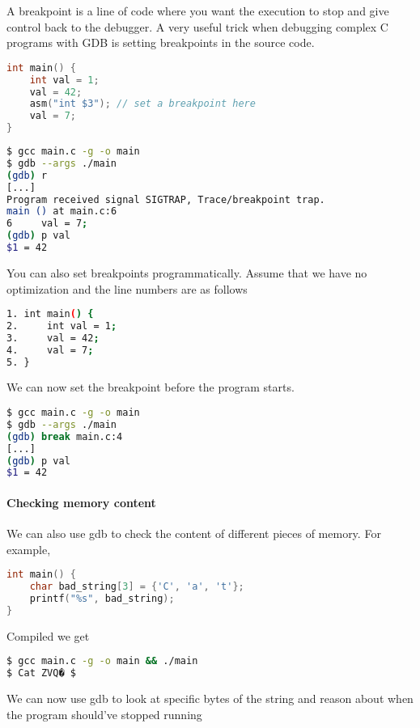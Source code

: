 A breakpoint is a line of code where you want the execution to stop and give control back to the debugger.
A very useful trick when debugging complex C programs with GDB is setting breakpoints in the source code.

\begin{lstlisting}[language=C]
int main() {
    int val = 1;
    val = 42;
    asm("int $3"); // set a breakpoint here
    val = 7;
}
\end{lstlisting}

\begin{lstlisting}[language=bash]
$ gcc main.c -g -o main
$ gdb --args ./main
(gdb) r
[...]
Program received signal SIGTRAP, Trace/breakpoint trap.
main () at main.c:6
6     val = 7;
(gdb) p val
$1 = 42
\end{lstlisting}

You can also set breakpoints programmatically.
Assume that we have no optimization and the line numbers are as follows

\begin{lstlisting}[language=bash]
1. int main() {
2.     int val = 1;
3.     val = 42;
4.     val = 7;
5. }
\end{lstlisting}

We can now set the breakpoint before the program starts.

\begin{lstlisting}[language=bash]
$ gcc main.c -g -o main
$ gdb --args ./main
(gdb) break main.c:4
[...]
(gdb) p val
$1 = 42
\end{lstlisting}

\paragraph{Checking memory content}


We can also use gdb to check the content of different pieces of memory.
For example,

\begin{lstlisting}[language=C]
int main() {
    char bad_string[3] = {'C', 'a', 't'};
    printf("%s", bad_string);
}
\end{lstlisting}

Compiled we get

\begin{lstlisting}[language=bash]
$ gcc main.c -g -o main && ./main
$ Cat ZVQ� $
\end{lstlisting}


We can now use gdb to look at specific bytes of the string and reason about when the program should've stopped running

